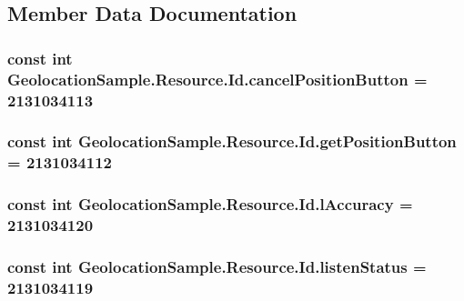 \subsection{Member Data Documentation}
\hypertarget{class_geolocation_sample_1_1_resource_1_1_id_a09dfbb15e68dfd681259766207463b58}{
\subsubsection[{cancel\+Position\+Button}]{\setlength{\rightskip}{0pt plus 5cm}const int Geolocation\+Sample.\+Resource.\+Id.\+cancel\+Position\+Button = 2131034113}}\label{class_geolocation_sample_1_1_resource_1_1_id_a09dfbb15e68dfd681259766207463b58}
\hypertarget{class_geolocation_sample_1_1_resource_1_1_id_aa0255ae2e02fa8824a0922184cb177b8}{
\subsubsection[{get\+Position\+Button}]{\setlength{\rightskip}{0pt plus 5cm}const int Geolocation\+Sample.\+Resource.\+Id.\+get\+Position\+Button = 2131034112}}\label{class_geolocation_sample_1_1_resource_1_1_id_aa0255ae2e02fa8824a0922184cb177b8}
\hypertarget{class_geolocation_sample_1_1_resource_1_1_id_a155911b232e6a77ccff5fcd231d6045f}{
\subsubsection[{l\+Accuracy}]{\setlength{\rightskip}{0pt plus 5cm}const int Geolocation\+Sample.\+Resource.\+Id.\+l\+Accuracy = 2131034120}}\label{class_geolocation_sample_1_1_resource_1_1_id_a155911b232e6a77ccff5fcd231d6045f}
\hypertarget{class_geolocation_sample_1_1_resource_1_1_id_a3213a0062b76ca46cefe01eb33a8af38}{
\subsubsection[{listen\+Status}]{\setlength{\rightskip}{0pt plus 5cm}const int Geolocation\+Sample.\+Resource.\+Id.\+listen\+Status = 2131034119}}\label{class_geolocation_sample_1_1_resource_1_1_id_a3213a0062b76ca46cefe01eb33a8af38}
